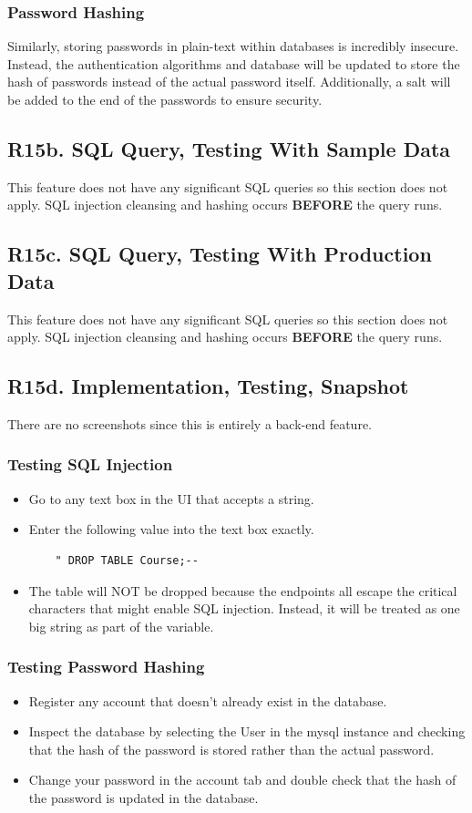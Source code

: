 \documentclass[12pt, a4paper]{article}
\begin{document}
\subsubsection*{Password Hashing}
Similarly, storing passwords in plain-text within databases is incredibly insecure. Instead, the authentication algorithms and database will be updated to store the hash of passwords instead of the actual password itself. Additionally, a salt will be added to the end of the passwords to ensure security. 
\subsection*{R15b. SQL Query, Testing With Sample Data}
This feature does not have any significant SQL queries so this section does not apply. SQL injection cleansing and hashing occurs \textbf{BEFORE} the query runs.
\subsection*{R15c. SQL Query, Testing With Production Data}
This feature does not have any significant SQL queries so this section does not apply. SQL injection cleansing and hashing occurs \textbf{BEFORE} the query runs.
\subsection*{R15d. Implementation, Testing, Snapshot}
There are no screenshots since this is entirely a back-end feature.
\subsubsection*{Testing SQL Injection}
\begin{itemize}
    \item Go to any text box in the UI that accepts a string.
    \item Enter the following value into the text box exactly.
\begin{verbatim}
    " DROP TABLE Course;--
\end{verbatim}
    \item The table will NOT be dropped because the endpoints all escape the critical characters that might enable SQL injection. Instead, it will be treated as one big string as part of the variable.
\end{itemize}
\subsubsection*{Testing Password Hashing}
\begin{itemize}
    \item Register any account that doesn't already exist in the database.
    \item Inspect the database by selecting the User in the mysql instance and checking that the hash of the password is stored rather than the actual password.
    \item Change your password in the account tab and double check that the hash of the password is updated in the database.
\end{itemize}
\end{document}
